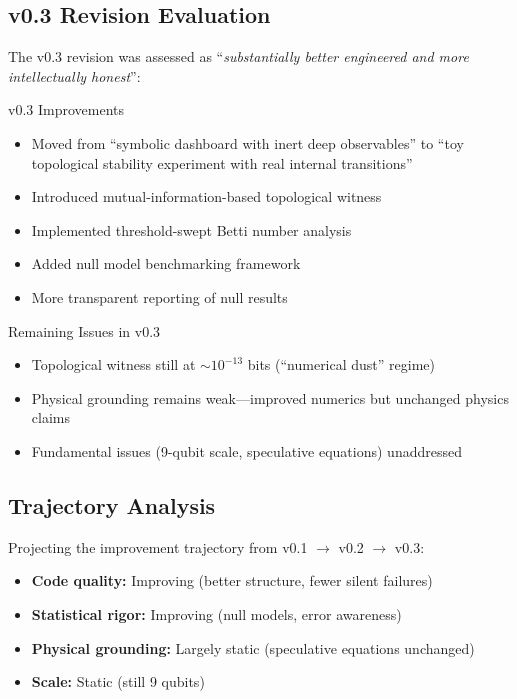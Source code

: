 \documentclass[11pt,a4paper]{article}
\begin{document}
\subsection{v0.3 Revision Evaluation}

The v0.3 revision was assessed as ``\textit{substantially better engineered and more intellectually honest}'':

\begin{okbox}{v0.3 Improvements}
\begin{itemize}[leftmargin=1.5em]
  \item Moved from ``symbolic dashboard with inert deep observables'' to ``toy topological stability experiment with real internal transitions''
  \item Introduced mutual-information-based topological witness
  \item Implemented threshold-swept Betti number analysis
  \item Added null model benchmarking framework
  \item More transparent reporting of null results
\end{itemize}
\end{okbox}

\begin{warnbox}{Remaining Issues in v0.3}
\begin{itemize}[leftmargin=1.5em]
  \item Topological witness still at $\sim 10^{-13}$ bits (``numerical dust'' regime)
  \item Physical grounding remains weak---improved numerics but unchanged physics claims
  \item Fundamental issues (9-qubit scale, speculative equations) unaddressed
\end{itemize}
\end{warnbox}

\subsection{Trajectory Analysis}

Projecting the improvement trajectory from v0.1 $\to$ v0.2 $\to$ v0.3:

\begin{itemize}[leftmargin=1.5em]
  \item \textbf{Code quality:} Improving (better structure, fewer silent failures)
  \item \textbf{Statistical rigor:} Improving (null models, error awareness)
  \item \textbf{Physical grounding:} Largely static (speculative equations unchanged)
  \item \textbf{Scale:} Static (still 9 qubits)
\end{itemize}
\end{document}
